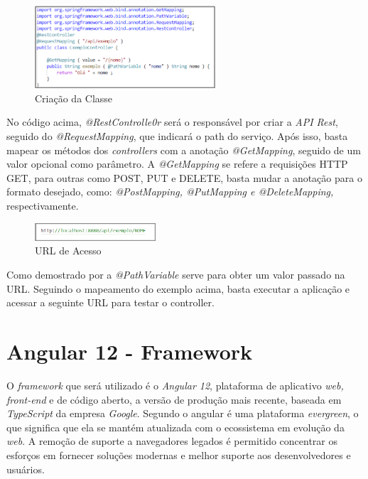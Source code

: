     \begin{figure}[h]
    \centering
    \includegraphics[width=0.60\textwidth]{./img/Classe.png}
    \caption{Criação da Classe}
    \label{fig:Classe}
    \end{figure}
    
    No código acima, \textit{@RestControlle0r} será o responsável por criar a \textit{API Rest}, seguido do \textit{@RequestMapping}, que indicará o path do serviço. Após isso, basta mapear os métodos dos \textit{controllers} com a anotação \textit{@GetMapping}, seguido de um valor opcional como parâmetro. A \textit{@GetMapping} se refere a requisições HTTP GET, para outras como POST, PUT e DELETE, basta mudar a anotação para o formato desejado, como: \textit{@PostMapping, @PutMapping e @DeleteMapping,} respectivamente.
    
    \begin{figure}[h]
    \centering
    \includegraphics[width=0.40\textwidth]{./img/Endereço.png}
    \caption{URL de Acesso}
    \label{fig:Endereço}
    \end{figure}
    
    Como demostrado por  a \textit{@PathVariable} serve para obter um valor passado na URL. Seguindo o mapeamento do exemplo acima, basta executar a aplicação e acessar a seguinte URL para testar o controller.


\section{Angular 12 - Framework}

    O \textit{framework} que será utilizado é o \textit{Angular 12}, plataforma de aplicativo \textit{web, front-end} e de código aberto, a versão de produção mais recente, baseada em \textit{TypeScript} da empresa \textit{Google}. Segundo  o angular é uma plataforma \textit{evergreen}, o que significa que ela se mantém atualizada com o ecossistema em evolução da \textit{web}. A remoção de suporte a navegadores legados é permitido concentrar os esforços em fornecer soluções modernas e melhor suporte aos desenvolvedores e usuários.

